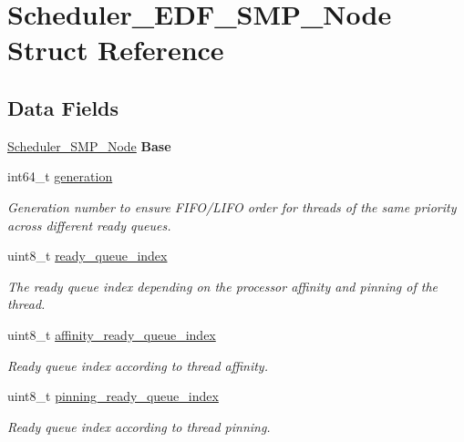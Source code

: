 \hypertarget{structScheduler__EDF__SMP__Node}{}\section{Scheduler\+\_\+\+E\+D\+F\+\_\+\+S\+M\+P\+\_\+\+Node Struct Reference}
\label{structScheduler__EDF__SMP__Node}
\subsection*{Data Fields}
\begin{DoxyCompactItemize}
\item 
\mbox{\label{structScheduler__EDF__SMP__Node_a1606762a905470642bd951e708b4fa8c}} 
\mbox{\hyperlink{structScheduler__SMP__Node}{Scheduler\+\_\+\+S\+M\+P\+\_\+\+Node}} {\bfseries Base}
\item 
\mbox{\label{structScheduler__EDF__SMP__Node_aa60f75a8fcd680c655e2cd8f478e8764}} 
int64\+\_\+t \mbox{\hyperlink{structScheduler__EDF__SMP__Node_aa60f75a8fcd680c655e2cd8f478e8764}{generation}}
\begin{DoxyCompactList}\small\item\em Generation number to ensure F\+I\+F\+O/\+L\+I\+FO order for threads of the same priority across different ready queues. \end{DoxyCompactList}\item 
uint8\+\_\+t \mbox{\hyperlink{structScheduler__EDF__SMP__Node_af21e25f978153eb60b6c7b032f771f15}{ready\+\_\+queue\+\_\+index}}
\begin{DoxyCompactList}\small\item\em The ready queue index depending on the processor affinity and pinning of the thread. \end{DoxyCompactList}\item 
\mbox{\label{structScheduler__EDF__SMP__Node_acac25d856d559eafe05396b8ac0fc8d3}} 
uint8\+\_\+t \mbox{\hyperlink{structScheduler__EDF__SMP__Node_acac25d856d559eafe05396b8ac0fc8d3}{affinity\+\_\+ready\+\_\+queue\+\_\+index}}
\begin{DoxyCompactList}\small\item\em Ready queue index according to thread affinity. \end{DoxyCompactList}\item 
\mbox{\label{structScheduler__EDF__SMP__Node_acc18f57964696e7f5a52cc258269fb93}} 
uint8\+\_\+t \mbox{\hyperlink{structScheduler__EDF__SMP__Node_acc18f57964696e7f5a52cc258269fb93}{pinning\+\_\+ready\+\_\+queue\+\_\+index}}
\begin{DoxyCompactList}\small\item\em Ready queue index according to thread pinning. \end{DoxyCompactList}\end{DoxyCompactItemize}


